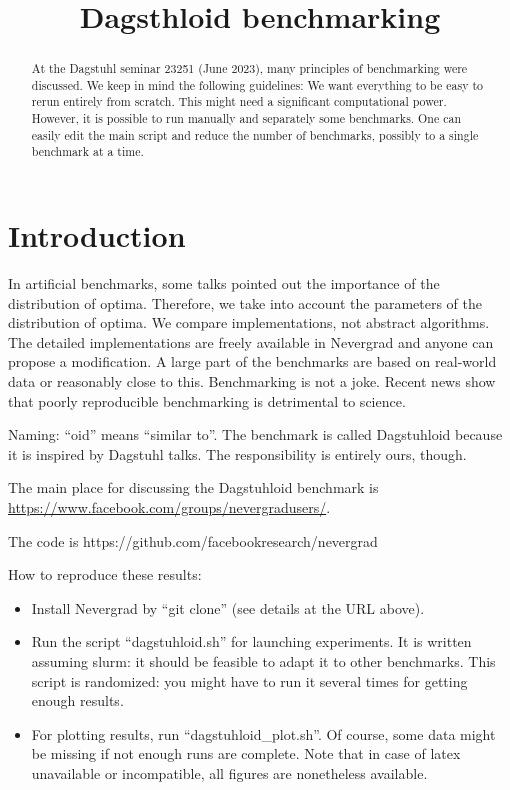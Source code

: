 \documentclass{article}
\begin{document}
\title{Dagsthloid benchmarking}

\maketitle

\tableofcontents

\begin{abstract}
At the Dagstuhl seminar 23251 (June 2023), many principles of benchmarking were discussed.
We keep in mind the following guidelines:
We want everything to be easy to rerun entirely from scratch. This might need a significant computational power.
However, it is possible to run manually and separately some benchmarks. One can easily edit the main script and reduce the number of benchmarks, possibly to a single benchmark at a time.


\end{abstract}

\section{Introduction}

In artificial benchmarks, some talks pointed out the importance of the distribution of optima. Therefore, we take into account the parameters of the distribution of optima.
We compare implementations, not abstract algorithms. The detailed implementations are freely available in Nevergrad and anyone can propose a modification.
A large part of the benchmarks are based on real-world data or reasonably close to this.
Benchmarking is not a joke. Recent news show that poorly reproducible benchmarking is detrimental to science.

Naming: “oid” means “similar to”. The benchmark is called Dagstuhloid because it is inspired by Dagstuhl talks. The responsibility is entirely ours, though.

The main place for discussing the Dagstuhloid benchmark is \url{https://www.facebook.com/groups/nevergradusers/}. 

The code is https://github.com/facebookresearch/nevergrad

How to reproduce these results:
\begin{itemize}
\item Install Nevergrad by “git clone” (see details at the URL above).
\item Run the script “dagstuhloid.sh” for launching experiments. It is written assuming slurm: it should be feasible to adapt it to other benchmarks. This script is randomized: you might have to run it several times for getting enough results.
\item For plotting results, run “dagstuhloid\_plot.sh”. Of course, some data might be missing if not enough runs are complete. Note that in case of latex unavailable or incompatible, all figures are nonetheless available.
\end{itemize}
\end{document}
